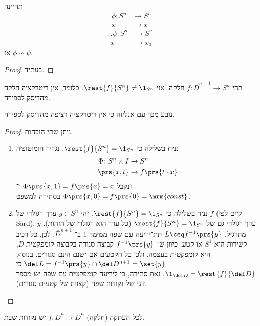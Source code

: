 \documentclass[a4paper,10pt,twoside,openany]{book}
\begin{document}
\begin{theorem}
תהיינה
\begin{align*}
\phi \colon S^n &\to S^n \\ x &\to x
\end{align*}
\begin{align*}
\text{.}\psi \colon S^n &\to S^n \\ x &\to x_0
\end{align*}
אז
$\phi \not\sim\psi$.
\end{theorem}
\begin{proof}
בעתיד.
\renewcommand{\blacksquare}{}
\end{proof}
\begin{corollary}
תהי
$f \colon \bar{D}^{n+1} \to S^n$
חלקה.
אזי
$\rest{f}{S^n} \neq \1_{S^n}$.
כלומר, אין ריטרקציה חלקה מהדיסק לספירה.
\end{corollary}
\begin{remark}
נובע מכך עם אנליזה כי אין ריטרקציה רציפה מהדיסק לספירה.
\end{remark}
\begin{proof}
ניתן שתי הוכחות.
\begin{enumerate}
\item נניח בשלילה כי
$\rest{f}{S^n} = \1_{S^n}$.
נגדיר הומוטופיה
\begin{align*}
\Phi \colon S^n \times I &\to S^n \\
\prs{x,t} &\to f\prs{t\cdot x}
\end{align*}
ונקבל
$\Phi\prs{x,1} = f\prs{x} = x$
ו־%
$\Phi\prs{x,0} = f\prs{0} = \mrm{const}$
בסתירה למשפט.
\item
נניח בשלילה כי
$\rest{f}{S^n} = \1_{S^n}$.
יהי
$y \in S^n$
ערך רגולרי של
$f$
(קיים לפי
\textenglish{Sard}).
$y$
ערך רגולרי גם של
$\rest{f}{S^n} = \1_{S^n}$
(כל ערך הוא רגולרי של הזהות).
מתרגיל,
$L \ceq f^{-1}\prs{y}$
תת־יריעה עם שפה ממימד 1 ב־%
$\bar{D}^{n+1}$.
לכן, כל רכיב קשירות הוא
$S^1$
או
קטע.
כיוון ש־%
$f^{-1}\prs{y}$
קבוצה סגורה בקבוצה קומפקטית
$\bar{D}$,
היא קומפקטית בעצמה, ולכן כל הקטעים אם ישנם הינם סגורים.
בנוסף,
$\del L = f^{-1} \prs{y} \cap \del \bar{D}^{n+1} = \set{y}$
כי
$\1_{\del D} = \rest{f}{\del D}$.
זאת סתירה, כי ליריעה קומפקטית עם שפה יש מספר זוגי של נקודות שפה (קצוות של קטעים סגורים).
\end{enumerate}
\end{proof}
\begin{corollary}
לכל העתקה (חלקה)
$f \colon \bar{D}^n \to \bar{D}^n$
יש נקודות שבת.
\end{corollary}
\end{document}
